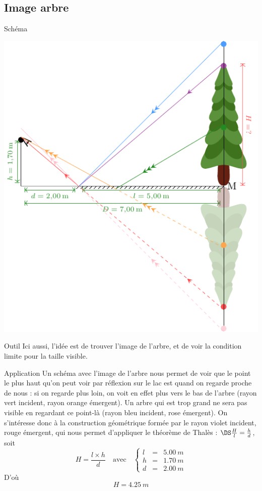 \documentclass[a4paper, 12pt, final, garamond]{book}
\begin{document}
\subsection{Image arbre}
\begin{NCdefi}{Schéma}
    \begin{center}
        \includegraphics[width=.7\linewidth]{ch3-arbre-2}
    \end{center}
\end{NCdefi}
\begin{NCrapp}[]{Outil}
    Ici aussi, l'idée est de trouver l'image de l'arbre, et de voir
    la condition limite pour la taille visible.
\end{NCrapp}
\begin{NCexem}{Application}
    Un schéma avec l'image de l'arbre nous permet de voir que le
    point le plus haut qu'on peut voir par réflexion sur le lac est
    quand on regarde proche de nous : si on regarde plus loin, on
    voit en effet plus vers le bas de l'arbre (rayon vert incident,
    rayon orange émergent). Un arbre qui est trop grand ne sera pas
    visible en regardant ce point-là (rayon bleu incident, rose
    émergent). On s'intéresse donc à la construction géométrique
    formée par le rayon violet incident, rouge émergent, qui nous
    permet d'appliquer le théorème de Thalès : $\DS\frac{H}{l} =
    \frac{h}{d}$, soit
    \[\boxed{H = \frac{l\times h}{d}} \quad \text{avec} \quad
        \left\{
            \begin{array}{rcl}
                l & = & \SI{5.00}{m}\\
                h & = & \SI{1.70}{m}\\
                d & = & \SI{2.00}{m}
            \end{array}
    \right.\]
    D'où
    \[\boxed{H = \SI{4.25}{m}}\]
\end{NCexem}
\end{document}
